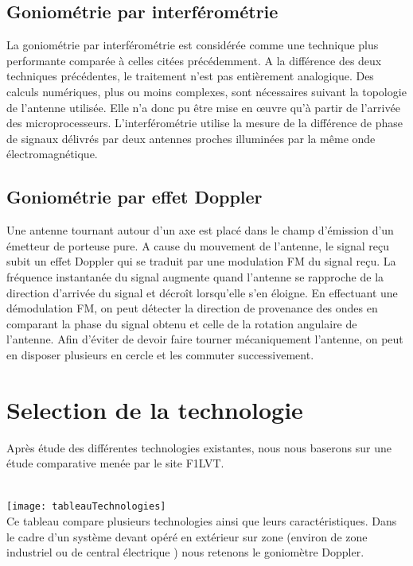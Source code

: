 \subsection{Goniométrie par interférométrie}

	La goniométrie par interférométrie est considérée comme une technique plus performante comparée à celles citées précédemment. A la différence des deux techniques précédentes, le traitement n’est pas entièrement analogique. Des calculs numériques, plus ou moins complexes, sont nécessaires suivant la topologie de l’antenne utilisée. Elle n’a donc pu être mise en œuvre qu’à partir de l’arrivée des microprocesseurs.
L’interférométrie utilise la mesure de la différence de phase de signaux délivrés par deux antennes proches illuminées par la même onde électromagnétique.

\subsection{Goniométrie par effet Doppler}

	Une antenne tournant autour d'un axe est placé dans le champ d'émission d'un émetteur de porteuse pure. A cause du mouvement de l'antenne, le signal reçu subit un effet Doppler qui se traduit par une modulation FM du signal reçu. La fréquence instantanée du signal augmente quand l’antenne se rapproche de la direction d’arrivée du signal et décroît lorsqu’elle s’en éloigne. En effectuant une démodulation FM, on peut détecter la direction de provenance des ondes en comparant la phase du signal obtenu et celle de la rotation angulaire de l’antenne. 
Afin d'éviter de devoir faire tourner mécaniquement l'antenne, on peut en disposer plusieurs en cercle et les commuter successivement.

\section{Selection de la technologie}

	Après étude des différentes technologies existantes, nous nous baserons sur une étude comparative menée par le site F1LVT.

~\\	
	\texttt{[image: tableauTechnologies]}
\parindent=15pt
~\\

	Ce tableau compare plusieurs technologies ainsi que leurs caractéristiques. Dans le cadre d’un système devant opéré en extérieur sur zone (environ de zone industriel ou de central électrique ) nous retenons le goniomètre Doppler.





